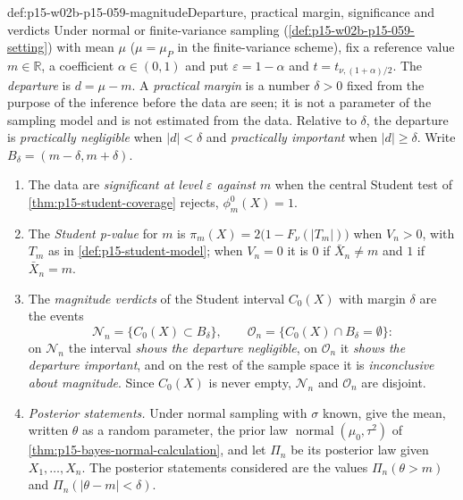 \begin{hbdefinition}{def:p15-w02b-p15-059-magnitude}{Departure, practical margin, significance and verdicts}
Under normal or finite-variance sampling
(\cref{def:p15-w02b-p15-059-setting}) with mean \(\mu\) (\(\mu=\mu_P\) in
the finite-variance scheme), fix a reference value \(m\in\mathbb R\), a
coefficient \(\alpha\in(0,1)\) and put \(\varepsilon=1-\alpha\) and
\(t=t_{\nu,(1+\alpha)/2}\). The \emph{departure} is \(d=\mu-m\).
A \emph{practical margin} is a number \(\delta>0\) fixed from the purpose
of the inference before the data are seen; it is not a parameter of the
sampling model and is not estimated from the data. Relative to \(\delta\),
the departure is \emph{practically negligible} when \(|d|<\delta\) and
\emph{practically important} when \(|d|\geq\delta\). Write
\(B_\delta=(m-\delta,m+\delta)\).
\begin{enumerate}
\item The data are \emph{significant at level \(\varepsilon\) against
\(m\)} when the central Student test of \cref{thm:p15-student-coverage}
rejects, \(\phi_m^0(X)=1\).
\item The \emph{Student p-value} for \(m\) is
\(\pi_m(X)=2\bigl(1-F_\nu(|T_m|)\bigr)\) when \(V_n>0\), with \(T_m\) as in
\cref{def:p15-student-model}; when \(V_n=0\) it is \(0\) if
\(\bar X_n\neq m\) and \(1\) if \(\bar X_n=m\).
\item The \emph{magnitude verdicts} of the Student interval \(C_0(X)\) with
margin \(\delta\) are the events
\[
 \mathcal N_n=\{C_0(X)\subset B_\delta\},\qquad
 \mathcal O_n=\{C_0(X)\cap B_\delta=\emptyset\}:
\]
on \(\mathcal N_n\) the interval \emph{shows the departure negligible}, on
\(\mathcal O_n\) it \emph{shows the departure important}, and on the rest
of the sample space it is \emph{inconclusive about magnitude}. Since
\(C_0(X)\) is never empty, \(\mathcal N_n\) and \(\mathcal O_n\) are
disjoint.
\item \emph{Posterior statements.} Under normal sampling with \(\sigma\)
known, give the mean, written \(\theta\) as a random parameter, the prior
law \(\operatorname{normal}(\mu_0,\tau^2)\) of
\cref{thm:p15-bayes-normal-calculation}, and let \(\Pi_n\) be its posterior
law given \(X_1,\ldots,X_n\). The posterior statements considered are the
values \(\Pi_n(\theta>m)\) and \(\Pi_n(|\theta-m|<\delta)\).
\end{enumerate}
\end{hbdefinition}

